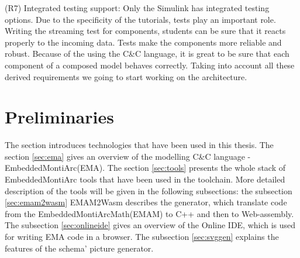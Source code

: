 (R7) Integrated testing support: Only the Simulink has integrated testing options. Due to the specificity of the tutorials, tests play an important role. Writing the streaming test for components, students can be sure that it reacts properly to the incoming data. Tests make the components more reliable and robust. Because of the using the C\&C language, it is great to be sure that each component of a composed model behaves correctly.  
Taking into account all these derived requirements we going to start working on the architecture.\\

\cleardoublepage

\chapter{Preliminaries}
The section introduces technologies that have been used in this thesis. The section \ref{sec:ema} gives an overview of the modelling C\&C language - EmbeddedMontiArc(EMA). The section \ref{sec:tools} presents the whole stack of EmbeddedMontiArc tools that have been used in the toolchain. More detailed description of the tools will be given in the following subsections: the subsection \ref{sec:emam2wasm} EMAM2Wasm describes the generator, which translate code from the EmbeddedMontiArcMath(EMAM) to C++ and then to Web-assembly. The subsection \ref{sec:onlineide} gives an overview of the Online IDE, which is used for writing EMA code in a browser. The subsection \ref{sec:svggen} explains the features of the schema' picture generator.
